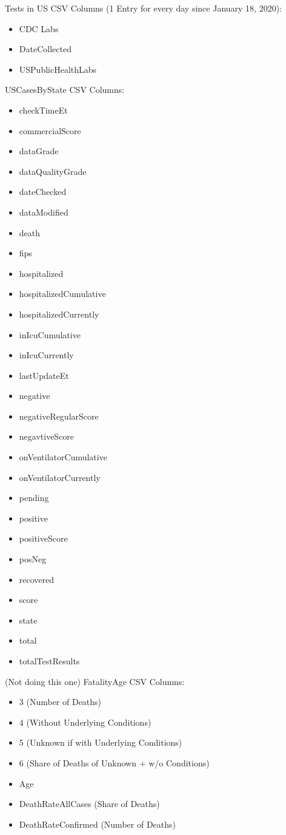 \documentclass[11pt]{article}
\newcommand{\comment}[1]{{\color{red}{#1}}}
\begin{document}
\noindent
Tests in US CSV Columns (1 Entry for every day since January 18, 2020):

\begin{itemize}
    \item CDC Labs
    \item DateCollected
    \item USPublicHealthLabs
\end{itemize}

\noindent
USCasesByState CSV Columns:

\begin{itemize}
    \item checkTimeEt
    \item commercialScore
    \item dataGrade
    \item dataQualityGrade
    \item dateChecked
    \item dataModified
    \item death
    \item fips
    \item hospitalized
    \item hospitalizedCumulative
    \item hospitalizedCurrently
    \item inIcuCumulative
    \item inIcuCurrently
    \item lastUpdateEt
    \item negative
    \item negativeRegularScore
    \item negavtiveScore
    \item onVentilatorCumulative
    \item onVentilatorCurrently
    \item pending
    \item positive
    \item positiveScore
    \item posNeg
    \item recovered
    \item score
    \item state
    \item total
    \item totalTestResults
\end{itemize}


\noindent
(Not doing this one) FatalityAge CSV Columns:

\begin{itemize}
    \item 3 (Number of Deaths)
    \item 4 (Without Underlying Conditions)
    \item 5 (Unknown if with Underlying Conditions)
    \item 6 (Share of Deaths of Unknown + w/o Conditions)
    \item Age
    \item DeathRateAllCases (Share of Deaths)
    \item DeathRateConfirmed (Number of Deaths)
\end{itemize}
\end{document}
